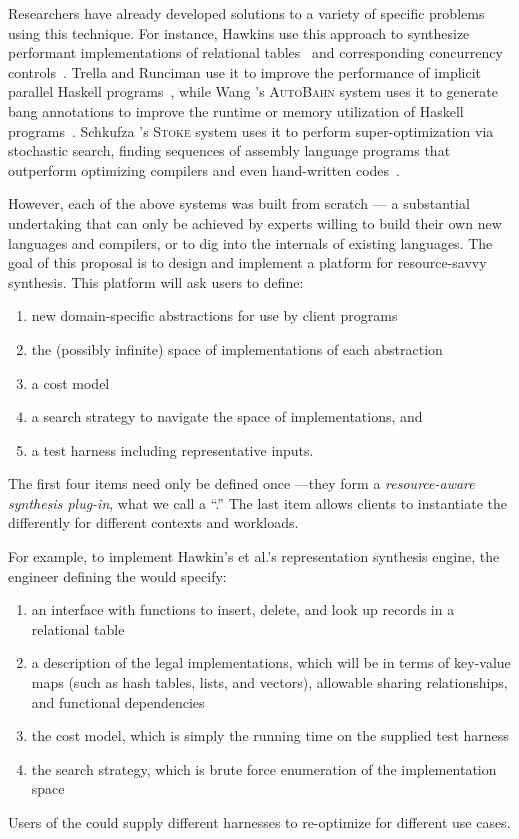 Researchers have already developed solutions to a variety of specific problems
using this technique.  
For instance, Hawkins \etal{} use this approach to synthesize
performant implementations of relational tables~\cite{data-rep-synth} 
and corresponding concurrency controls~\cite{conc-data-rep-synth}.
Trella and Runciman use it to improve the performance of implicit parallel
Haskell programs~\cite{implicit-parallel}, while
Wang \etal{}'s \textsc{AutoBahn} system uses it to generate bang
annotations to improve the runtime or memory utilization of Haskell
programs~\cite{autobahn}.  Schkufza \etal{}'s \textsc{Stoke} system
uses it to perform super-optimization via stochastic search, finding
sequences of assembly language programs that outperform optimizing
compilers and even hand-written codes~\cite{stochastic-superopt}.

However, each of the above systems was built from scratch --- a substantial undertaking
that can only be achieved by experts willing to build their own new languages and
compilers, or to dig into the internals of existing languages.  The goal of
this proposal is to design and implement a platform for resource-savvy
synthesis.  This platform will ask users to define:

\begin{enumerate}
\item new domain-specific abstractions for use by client programs
\item the (possibly infinite) space of implementations of each abstraction
\item a cost model
\item a search strategy to navigate the space of implementations, and 
\item a test harness including representative inputs.
\end{enumerate}
%
The first four items need only be defined once ---they form a
\emph{resource-aware synthesis plug-in}, what we call a ``\rasp{}.''
The last item allows clients to instantiate the \rasp{} differently for
different contexts and workloads.

For example, to implement Hawkin's et al.'s representation synthesis engine, the
engineer defining the \rasp{} would specify:

\begin{enumerate}
\item an interface with functions to insert, delete, and look up records in a relational table
\item a description of the legal implementations, which will be in terms of key-value maps
(such as hash tables, lists, and vectors), allowable sharing
relationships, and functional dependencies
\item the cost model, which is simply the running time on the supplied test harness
\item the search strategy, which is brute force enumeration of the implementation space
\end{enumerate}
%
Users of the \rasp{} could supply different harnesses to re-optimize for
different use cases.

